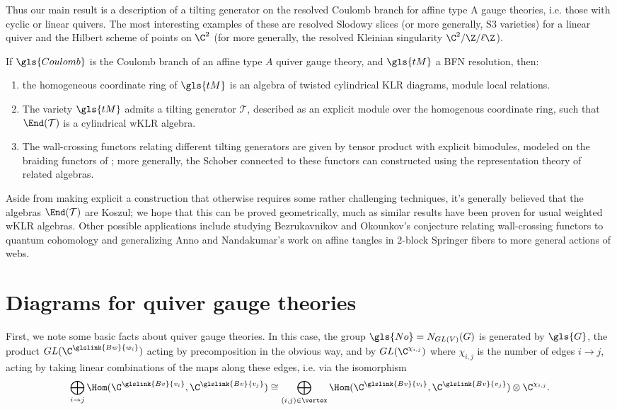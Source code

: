 Thus our main result is a description of a tilting generator on the
resolved Coulomb branch for affine type A gauge theories, i.e. those
with cyclic or linear quivers.  The most interesting examples of these
are resolved Slodowy slices (or more generally, S3 varieties) for a linear
quiver and the Hilbert scheme of points on $\C^2$ (for more generally,
the resolved Kleinian singularity $\C^2/\Z/\ell\Z$).  
\begin{itheorem}
  If $\gls{Coulomb}$ is the Coulomb branch of an affine type $A$ quiver gauge
  theory, and $\gls{tM}$ a BFN resolution, then:
  \begin{enumerate}
  \item the homogeneous coordinate ring of $\gls{tM}$ is an algebra of
    twisted cylindrical KLR diagrams, module local relations.
  \item The variety $ \gls{tM}$ admits a tilting generator $\mathcal{T}$,
    described as an explicit module over the homogenous coordinate
    ring, such that $\End(\mathcal{T})$ is a cylindrical wKLR algebra.
  \item The wall-crossing functors relating different tilting
    generators are given by tensor product with explicit bimodules,
    modeled on the braiding functors of \cite[\S 6]{Webmerged}; more
    generally, the Schober connected to these functors can constructed
    using the representation theory of related algebras.
  \end{enumerate}
\end{itheorem}
Aside from making explicit a construction that otherwise requires some
rather challenging techniques, it's generally believed that the
algebras $\End(\mathcal{T})$ are Koszul; we hope that this can be
proved geometrically, much as similar results have been proven for
usual weighted wKLR algebras.  Other possible applications include
studying Bezrukavnikov and Okounkov's conjecture relating
wall-crossing functors to quantum cohomology and generalizing Anno and
Nandakumar's work on affine tangles in 2-block Springer fibers to more
general actions of webs.  

\section{Diagrams for quiver gauge theories}


First, we note some basic facts about quiver gauge theories.  In this case, the group $\gls{No}=N_{GL(V)}(G)$ is generated by $\gls{G}$, the product
$GL(\C^{\glslink{Bw}{w_i}})$ acting by precomposition in the obvious way, and by
$GL(\C^{\chi_{i,j}})$ where $\chi_{i,j}$ is the number of edges
$i\to j$, acting by taking linear combinations of the maps along these
edges, i.e. via the isomorphism
\[\bigoplus_{i\to j}\Hom(\C^{\glslink{Bv}{v_i}},\C^{\glslink{Bv}{v_j}})\cong \bigoplus_{(i,j)\in {\vertex}}
  \Hom(\C^{\glslink{Bv}{v_i}},\C^{\glslink{Bv}{v_j}})\otimes \C^{\chi_{i,j}}.\]

